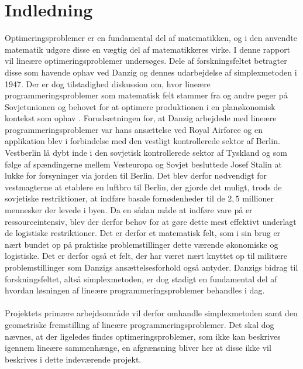 \chapter{Indledning}
Optimeringsproblemer er en fundamental del af matematikken, og i den anvendte matematik udgøre disse en vægtig del af matematikkeres virke.
I denne rapport vil lineære optimeringsproblemer undersøges. 
Dele af forskningsfeltet betragter disse som havende ophav ved Danzig og dennes udarbejdelse af simplexmetoden \citep[side 107]{refa} i 1947.
Der er dog tilstadighed diskussion om, hvor lineære programmeringsproblemer som matematisk felt stammer fra og andre peger på Sovjetunionen og behovet for at optimere produktionen i en planøkonomisk kontekst som ophav \citep[side 155]{refb}.
Forudsætningen for, at Danzig arbejdede med lineære programmeringsproblemer var hans ansættelse ved Royal Airforce \citep[side 107]{refa} og en applikation blev i forbindelse med den vestligt kontrollerede sektor af Berlin.
Vestberlin lå dybt inde i den sovjetisk kontrollerede sektor af Tyskland og som følge af spændingerne mellem Vesteuropa og Sovjet besluttede Josef Stalin at lukke for forsyninger via jorden til Berlin.
Det blev derfor nødvendigt for vestmagterne at etablere en luftbro til Berlin, der gjorde det muligt, trods de sovjetiske restriktioner, at indføre basale fornødenheder til de $2,5$ millioner mennesker der levede i byen.
Da en sådan måde at indføre vare på er ressourceintensiv, blev der derfor behov for at gøre dette mest effektivt underlagt de logistiske restriktioner.
Det er derfor et matematisk felt, som i sin brug er nært bundet op på praktiske problemstillinger dette værende økonomiske og logistiske.
Det er derfor også et felt, der har været nært knyttet op til militære problemstillinger som Danzigs ansættelsesforhold også antyder.
Danzigs bidrag til forskningsfeltet, altså simplexmetoden, er dog stadigt en fundamental del af hvordan løsningen af lineære programmeringsproblemer behandles i dag.
\\\\
Projektets primære arbejdsområde vil derfor omhandle simplexmetoden samt den geometriske fremstilling af lineære programmeringsproblemer.
Det skal dog nævnes, at der ligeledes findes optimeringsproblemer, som ikke kan beskrives igennem lineære sammenhænge, en afgrænsning bliver her at disse ikke vil beskrives i dette indeværende projekt.
